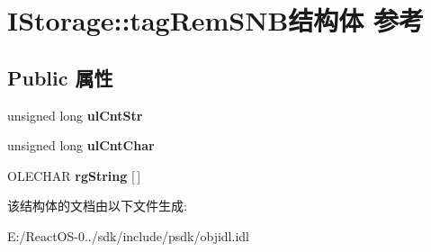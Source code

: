 \hypertarget{struct_i_storage_1_1tag_rem_s_n_b}{}\section{I\+Storage\+:\+:tag\+Rem\+S\+N\+B结构体 参考}
\label{struct_i_storage_1_1tag_rem_s_n_b}
\subsection*{Public 属性}
\begin{DoxyCompactItemize}
\item 
\mbox{\label{struct_i_storage_1_1tag_rem_s_n_b_a440789b606119cf6c33541aa4b489efc}} 
unsigned long {\bfseries ul\+Cnt\+Str}
\item 
\mbox{\label{struct_i_storage_1_1tag_rem_s_n_b_adae85f991c619572a9c47ef7a2582b29}} 
unsigned long {\bfseries ul\+Cnt\+Char}
\item 
\mbox{\label{struct_i_storage_1_1tag_rem_s_n_b_a0a4d9cc6d983db4bbed316099d1c712d}} 
O\+L\+E\+C\+H\+AR {\bfseries rg\+String} \mbox{[}$\,$\mbox{]}
\end{DoxyCompactItemize}


该结构体的文档由以下文件生成\+:\begin{DoxyCompactItemize}
\item 
E\+:/\+React\+O\+S-\/0../sdk/include/psdk/objidl.\+idl\end{DoxyCompactItemize}
